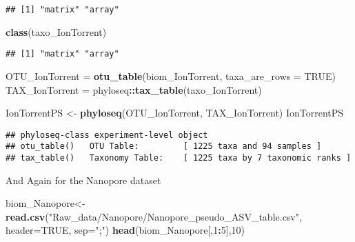 \documentclass[
]{article}
\newenvironment{Shaded}{\begin{snugshade}}{\end{snugshade}}
\newcommand{\AttributeTok}[1]{\textcolor[rgb]{0.13,0.29,0.53}{#1}}
\newcommand{\ConstantTok}[1]{\textcolor[rgb]{0.56,0.35,0.01}{#1}}
\newcommand{\DecValTok}[1]{\textcolor[rgb]{0.00,0.00,0.81}{#1}}
\newcommand{\FunctionTok}[1]{\textcolor[rgb]{0.13,0.29,0.53}{\textbf{#1}}}
\newcommand{\NormalTok}[1]{#1}
\newcommand{\OtherTok}[1]{\textcolor[rgb]{0.56,0.35,0.01}{#1}}
\newcommand{\SpecialCharTok}[1]{\textcolor[rgb]{0.81,0.36,0.00}{\textbf{#1}}}
\newcommand{\StringTok}[1]{\textcolor[rgb]{0.31,0.60,0.02}{#1}}
\begin{document}
\begin{verbatim}
## [1] "matrix" "array"
\end{verbatim}

\begin{Shaded}
\begin{Highlighting}[]
\FunctionTok{class}\NormalTok{(taxo\_IonTorrent) }
\end{Highlighting}
\end{Shaded}

\begin{verbatim}
## [1] "matrix" "array"
\end{verbatim}

\begin{Shaded}
\begin{Highlighting}[]
\NormalTok{OTU\_IonTorrent }\OtherTok{=} \FunctionTok{otu\_table}\NormalTok{(biom\_IonTorrent, }\AttributeTok{taxa\_are\_rows =} \ConstantTok{TRUE}\NormalTok{)}
\NormalTok{TAX\_IonTorrent }\OtherTok{=}\NormalTok{ phyloseq}\SpecialCharTok{::}\FunctionTok{tax\_table}\NormalTok{(taxo\_IonTorrent)}

\NormalTok{IonTorrentPS }\OtherTok{\textless{}{-}} \FunctionTok{phyloseq}\NormalTok{(OTU\_IonTorrent, TAX\_IonTorrent)}
\NormalTok{IonTorrentPS}
\end{Highlighting}
\end{Shaded}

\begin{verbatim}
## phyloseq-class experiment-level object
## otu_table()   OTU Table:         [ 1225 taxa and 94 samples ]
## tax_table()   Taxonomy Table:    [ 1225 taxa by 7 taxonomic ranks ]
\end{verbatim}

And Again for the Nanopore dataset

\begin{Shaded}
\begin{Highlighting}[]
\NormalTok{biom\_Nanopore}\OtherTok{\textless{}{-}} \FunctionTok{read.csv}\NormalTok{(}\StringTok{"Raw\_data/Nanopore/Nanopore\_pseudo\_ASV\_table.csv"}\NormalTok{, }
                        \AttributeTok{header=}\ConstantTok{TRUE}\NormalTok{, }\AttributeTok{sep=}\StringTok{";"}\NormalTok{)}
\FunctionTok{head}\NormalTok{(biom\_Nanopore[,}\DecValTok{1}\SpecialCharTok{:}\DecValTok{5}\NormalTok{],}\DecValTok{10}\NormalTok{)}
\end{Highlighting}
\end{Shaded}
\end{document}
